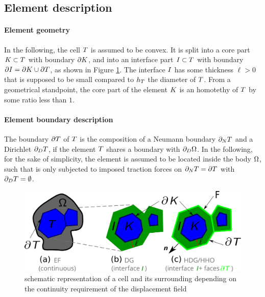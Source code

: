 \subsection{Element description}

\paragraph{Element geometry}

In the following, the cell $T$ is assumed to be convex.
It is split into a core part $K \subset T$ with boundary $\partial K$, and into an interface part $I{} \subset T$ with boundary $\partial I = \partial K \cup \partial T$, as shown in Figure \ref{fig_02}. The interface $I{}$ has some thickness $\ell > 0$ that is supposed to be small compared to $h_{T}$ the diameter of $T$.
From a geometrical standpoint, the core part of the element $K{}$ is an homotethy of $T$ by some ratio less than $1$.

\paragraph{Element boundary description} The boundary $\partial T{}$ of $T$ is the composition of a Neumann boundary $\partial_N T{}$ and a Dirichlet $\partial_D T{}$, if the element $T$ shares a boundary with $\partial_D \Omega{}$. In the following, for the sake of simplicity, the element is assumed to be located inside the body $\Omega{}$, such that is only subjected to imposed traction forces on $\partial_N T{} = \partial T{}$ with $\partial_D T{} = \emptyset$.
%
% 
% 
\begin{figure}[H]
    \centering
    \includegraphics[width=14.cm]{../chapter_01_hho_mechanics/figures/ef_dg_hdg.png}
    \caption{schematic representation of a cell and its surrounding depending on the continuity requirement of the displacement field}
    \label{fig_02}
\end{figure}
%
%
%

